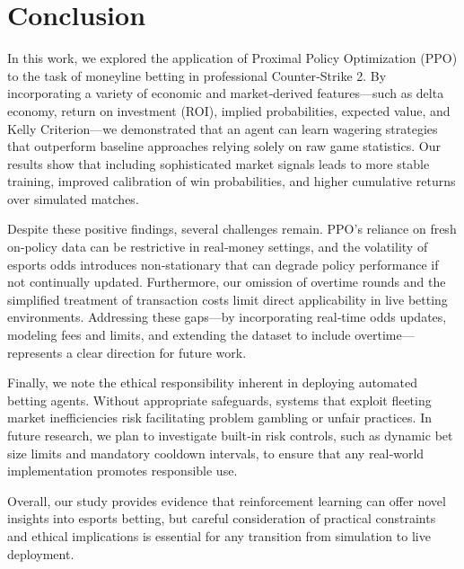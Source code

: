 \documentclass[sigconf]{acmart}
\begin{document}
\section{Conclusion}

In this work, we explored the application of Proximal Policy Optimization (PPO) to the task of moneyline betting in professional Counter‐Strike 2. By incorporating a variety of economic and market‐derived features—such as delta economy, return on investment (ROI), implied probabilities, expected value, and Kelly Criterion—we demonstrated that an agent can learn wagering strategies that outperform baseline approaches relying solely on raw game statistics. Our results show that including sophisticated market signals leads to more stable training, improved calibration of win probabilities, and higher cumulative returns over simulated matches.

Despite these positive findings, several challenges remain. PPO’s reliance on fresh on‐policy data can be restrictive in real‐money settings, and the volatility of esports odds introduces non‐stationary that can degrade policy performance if not continually updated. Furthermore, our omission of overtime rounds and the simplified treatment of transaction costs limit direct applicability in live betting environments. Addressing these gaps—by incorporating real‐time odds updates, modeling fees and limits, and extending the dataset to include overtime—represents a clear direction for future work.

Finally, we note the ethical responsibility inherent in deploying automated betting agents. Without appropriate safeguards, systems that exploit fleeting market inefficiencies risk facilitating problem gambling or unfair practices. In future research, we plan to investigate built‐in risk controls, such as dynamic bet size limits and mandatory cooldown intervals, to ensure that any real‐world implementation promotes responsible use.

Overall, our study provides evidence that reinforcement learning can offer novel insights into esports betting, but careful consideration of practical constraints and ethical implications is essential for any transition from simulation to live deployment.




\end{document}
